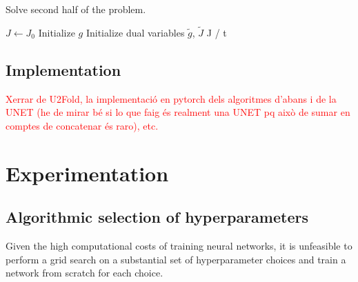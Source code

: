 \documentclass[twocolumn,twoside,a4paper,10pt]{IEEEtran}
\newcommand{\Frank}[1]{\textcolor{red}{#1}}
\begin{document}
\begin{algorithm}\caption{Solve second half of the problem.}
\label{al:I2-estimation}
\KwData{\sigma, \tau}
\(J\gets J_0\)\;
Initialize \(g\)\; 
Initialize dual variables \(\tilde{g}\), \(\tilde{J}\)\;
\Return J / t
\end{algorithm}

\subsection{Implementation}
\Frank{Xerrar de U2Fold, la implementació en pytorch dels algoritmes d'abans i de la UNET (he de mirar bé si lo que faig és realment una UNET pq això de sumar en comptes de concatenar és raro), etc.}
\section{Experimentation}
\subsection{Algorithmic selection of hyperparameters}
Given the high computational costs of training neural networks, it is unfeasible to perform a grid search on a substantial set of hyperparameter choices and train a network from scratch for each choice.
\end{document}
